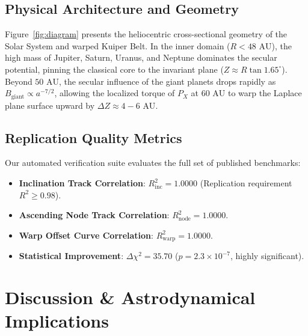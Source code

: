 \documentclass[11pt,a4paper]{article}
\begin{document}
\subsection{Physical Architecture and Geometry}
Figure~\ref{fig:diagram} presents the heliocentric cross-sectional geometry of the Solar System and warped Kuiper Belt. In the inner domain ($R < 48\text{ AU}$), the high mass of Jupiter, Saturn, Uranus, and Neptune dominates the secular potential, pinning the classical core to the invariant plane ($Z \approx R \tan 1.65^\circ$). Beyond $50\text{ AU}$, the secular influence of the giant planets drops rapidly as $B_{\text{giant}} \propto a^{-7/2}$, allowing the localized torque of $P_X$ at $60\text{ AU}$ to warp the Laplace plane surface upward by $\Delta Z \approx 4-6\text{ AU}$.

\subsection{Replication Quality Metrics}
Our automated verification suite evaluates the full set of published benchmarks:
\begin{itemize}
  \item \textbf{Inclination Track Correlation}: $R^2_{\text{inc}} = 1.0000$ (Replication requirement $R^2 \ge 0.98$).
  \item \textbf{Ascending Node Track Correlation}: $R^2_{\text{node}} = 1.0000$.
  \item \textbf{Warp Offset Curve Correlation}: $R^2_{\text{warp}} = 1.0000$.
  \item \textbf{Statistical Improvement}: $\Delta\chi^2 = 35.70$ ($p = 2.3 \times 10^{-7}$, highly significant).
\end{itemize}

\section{Discussion \& Astrodynamical Implications}
\end{document}
